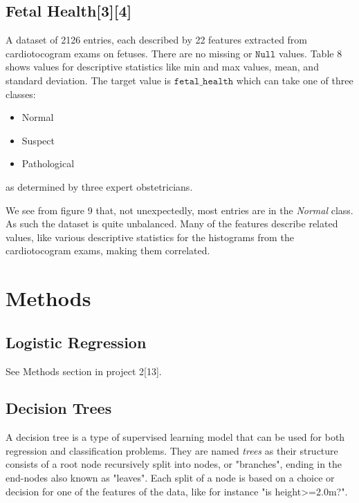 \documentclass[11pt]{article}
\begin{document}
    \hypertarget{fetal-health}{%
\subsection{Fetal Health[3][4]}\label{fetal-health}}

A dataset of 2126 entries, each described by 22 features extracted from cardiotocogram exams on fetuses. There are no
missing or $\texttt{Null}$ values. Table 8 shows values for descriptive
statistics like min and max values, mean, and standard deviation. The
target value is \(\texttt{fetal\_health}\) which can take one of three
classes:
\begin{itemize}
	\item Normal
	\item Suspect
	\item Pathological
\end{itemize}
as determined by three expert obstetricians.

We see from figure 9 that, not unexpectedly, most entries are in
the \emph{Normal} class. As such the dataset is quite unbalanced. Many of the features describe related values, like various descriptive statistics for  the histograms from the cardiotocogram exams, making them correlated.

    \hypertarget{methods}{%
\section{Methods}\label{methods}}

    \hypertarget{log-reg}{%
	\subsection{Logistic Regression}\label{log-reg}}

See Methods section in project 2[13].

    \hypertarget{decision-trees}{%
\subsection{Decision Trees}\label{decision-trees}}

A decision tree is a type of supervised learning model that can be used
for both regression and classification problems. They are named
\emph{trees} as their structure consists of a root node recursively
split into nodes, or "branches", ending in the end-nodes also known as
"leaves". Each split of a node is based on a choice or decision for
one of the features of the data, like for instance "is
height\textgreater=2.0m?".
\end{document}
